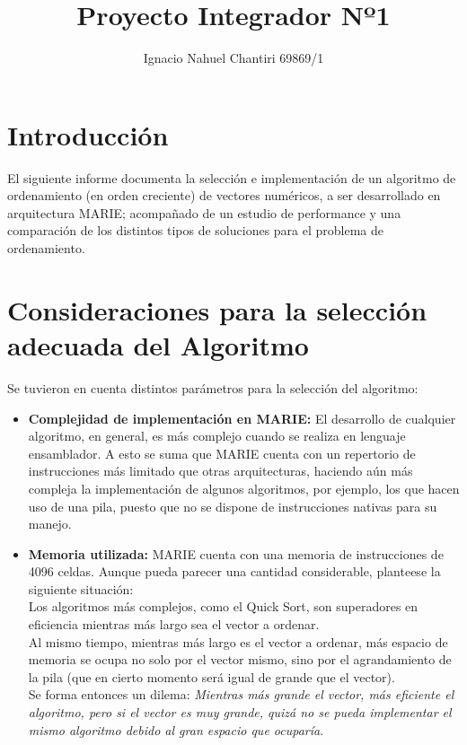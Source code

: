 \documentclass{sciposter}
\title{Proyecto Integrador Nº1
\\ }
\author{Ignacio Nahuel Chantiri 69869/1}
\institute 
{Facultad de Ingeniería de la Universidad Nacional de La Plata}
\begin{document}



\maketitle

\begin{multicols*}{2}

\section{Introducción}
El siguiente informe documenta la selección e implementación de un algoritmo de ordenamiento (en orden creciente) de vectores numéricos, a ser desarrollado en arquitectura MARIE; acompañado de un estudio de performance y una comparación de los distintos tipos de soluciones para el problema de ordenamiento.\\



\section{Consideraciones para la selección adecuada del Algoritmo}

Se tuvieron en cuenta distintos parámetros para la selección del algoritmo:

\begin{itemize}
    \item \textbf{Complejidad de implementación en MARIE:} El desarrollo de cualquier algoritmo, en general, es más complejo cuando se realiza en lenguaje ensamblador. A esto se suma que MARIE cuenta con un repertorio de instrucciones más limitado que otras arquitecturas, haciendo aún más compleja la implementación de algunos algoritmos, por ejemplo, los que hacen uso de una pila, puesto que no se dispone de instrucciones nativas para su manejo.
    
    \item \textbf{Memoria utilizada:} MARIE cuenta con una memoria de instrucciones de 4096 celdas. Aunque pueda parecer una cantidad considerable, planteese la siguiente situación:\\
    Los algoritmos más complejos, como el Quick Sort, son superadores en eficiencia mientras más largo sea el vector a ordenar.\\
    Al mismo tiempo, mientras más largo es el vector a ordenar, más espacio de memoria se ocupa no solo por el vector mismo, sino por el agrandamiento de la pila (que en cierto momento será igual de grande que el vector).\\
    Se forma entonces un dilema: \textit{Mientras más grande el vector, más eficiente el algoritmo, pero si el vector es muy grande, quizá no se pueda implementar el mismo algoritmo debido al gran espacio que ocuparía}.
    

\end{itemize}
\end{multicols*}
\end{document}
